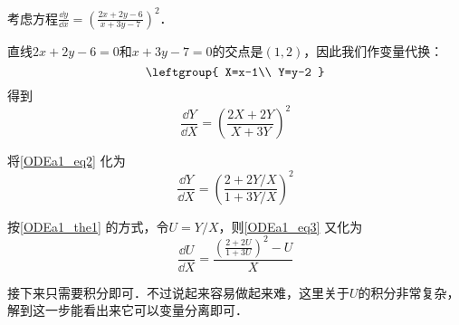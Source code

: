 \begin{example}{}
考虑方程$\frac{\dd y}{\dd x}=(\frac{2x+2y-6}{x+3y-7})^2$．

直线$2x+2y-6=0$和$x+3y-7=0$的交点是$(1, 2)$，因此我们作变量代换：
\begin{equation}
\leftgroup{
    X=x-1\\
    Y=y-2
}
\end{equation}
得到
\begin{equation}\label{ODEa1_eq2}
\frac{\dd Y}{\dd X}=(\frac{2X+2Y}{X+3Y})^2
\end{equation}

将\autoref{ODEa1_eq2} 化为
\begin{equation}\label{ODEa1_eq3}
\frac{\dd Y}{\dd X}=(\frac{2+2Y/X}{1+3Y/X})^2
\end{equation}

按\autoref{ODEa1_the1} 的方式，令$U=Y/X$，则\autoref{ODEa1_eq3} 又化为
\begin{equation}
\frac{\dd U}{\dd X}=\frac{(\frac{2+2U}{1+3U})^2-U}{X}
\end{equation}

接下来只需要积分即可．不过说起来容易做起来难，这里关于$U$的积分非常复杂，解到这一步能看出来它可以变量分离即可．

\end{example}

































